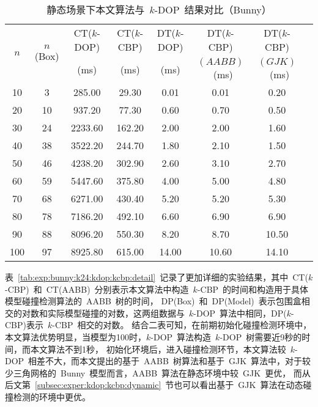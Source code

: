 \begin{table}[htb]  
\centering
\caption{静态场景下本文算法与~$k$-DOP~结果对比（Bunny）}
\label{tab:exp:bunny:k24:kdop:kcbp}
\begin{tabular}{cccccccc}
\toprule[1.5pt]
\multirow{2}{*}{$n$} & \multirow{2}{*}{$n$(Box)} & CT($k$-DOP) &  CT($k$-CBP) & DT($k$-DOP) & DT($k$-CBP) & DT($k$-CBP) \\%
                     &                         &  (ms)        & (ms)         & (ms)        & $(AABB)$~(ms) & $(GJK)$~(ms)       \\
\midrule[1.0pt]
10 & 3 &	285.00 &	29.30      &0.01 &	0.01  & 	0.20  \\ %
20 & 10&	937.20 &	77.30      &0.60 &	0.70  & 	0.50  \\ %
30 & 24&	2233.60&	162.20     &2.00 &	2.00  & 	1.60  \\ %
40 & 38&	3522.20&	244.70     &1.80 &	2.10  & 	1.50  \\ %
50 & 46&	4238.20&	302.90     &2.60 &	3.10  & 	2.70  \\ %
60 & 59&	5447.60&	375.80     &4.00 &	5.00  & 	4.80  \\ %
70 & 68&	6271.00&	430.40     &5.20 &	5.20  & 	5.30  \\ %
80 & 78&	7186.20&	492.10     &6.60 &	6.90  & 	6.90  \\ %
90 & 88&	8096.20&	550.30     &8.20 &	8.70  & 	10.50 \\ %
100& 97&	8925.80&	615.00     &14.00&	10.60 & 	14.10 \\ %
\bottomrule[1.5pt]
\end{tabular}
\end{table}

表~\ref{tab:exp:bunny:k24:kdop:kcbp:detail}~记录了更加详细的实验结果，其中~CT($k$-CBP)~和~CT(AABB)~分别表示本文算法中构造~$k$-CBP~的时间和构造用于具体模型碰撞检测算法的~AABB~树的时间，
DP(Box)~和~DP(Model)~表示包围盒相交的对数和实际模型碰撞的对数，这两组数据与~$k$-DOP~算法中相同，DP($k$-CBP)表示~$k$-CBP~相交的对数。
结合二表可知，在前期初始化碰撞检测环境中，本文算法优势明显，当模型为100时，$k$-DOP~算法构造~$k$-DOP~树需要近9秒的时间，而本文算法不到1秒，
初始化环境后，进入碰撞检测环节，本文算法较~$k$-DOP~相差不大，而本文提出的基于~AABB~树算法和基于~GJK~算法中，对于较少三角网格的~Bunny~模型而言，AABB~算法在静态环境中较~GJK~更优，
而从后文第~\ref{subsec:exper:kdop:kcbp:dynamic}~节也可以看出基于~GJK~算法在动态碰撞检测的环境中更优。 

